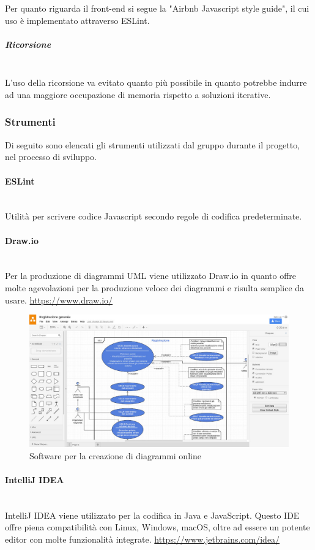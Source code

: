 			Per quanto riguarda il front-end si segue la "Airbnb Javascript style guide", il cui uso è implementato attraverso ESLint.
			\subparagraph{Ricorsione} \mbox{}\\
			L'uso della ricorsione va evitato quanto più possibile in  quanto  potrebbe
			indurre  ad  una  maggiore  occupazione  di  memoria  rispetto  a  soluzioni
			iterative.
	\subsubsection{Strumenti}
	Di seguito sono elencati gli strumenti utilizzati dal gruppo durante il progetto, nel processo di sviluppo.
		\paragraph{ESLint}\mbox{}\\
		Utilità per scrivere codice Javascript secondo regole di codifica predeterminate.
		\paragraph{Draw.io} \mbox{}\\
		Per la produzione di diagrammi UML viene utilizzato Draw.io in quanto offre molte agevolazioni per la produzione veloce dei diagrammi e risulta semplice da usare.
		\url{https://www.draw.io/}
		\begin{figure}[H]
			\includegraphics[width=0.99\linewidth]{res/images/drawio.jpg}
			\caption{Software per la creazione di diagrammi online}
		\end{figure} 
		\paragraph{IntelliJ IDEA} \mbox{}\\
		IntelliJ IDEA viene utilizzato per la codifica in Java e JavaScript. Questo IDE offre piena compatibilità con Linux, Windows, macOS, oltre ad essere un potente editor con molte funzionalità integrate.
		\url{https://www.jetbrains.com/idea/}

